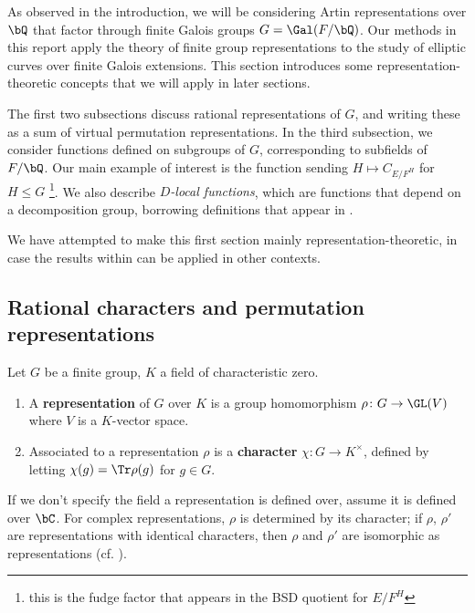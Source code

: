As observed in the introduction, we will be considering Artin representations over $\bQ$ that factor through finite Galois groups $G = \Gal(F / \bQ)$. Our methods in this report apply the theory of finite group representations to the study of elliptic curves over finite Galois extensions. This section introduces some representation-theoretic concepts that we will apply in later sections. 

The first two subsections discuss rational representations of $G$, and writing these as a sum of virtual permutation representations.
In the third subsection, we consider functions defined on subgroups of $G$, corresponding to subfields of $F / \bQ$. Our main example of interest is the function sending $H \mapsto C_{E / F^H}$ for $H \leq G$ \footnote{this is the fudge factor that appears in the BSD quotient for $E / F^H$}. We also describe \textit{$D$-local functions}, which are functions that depend on a decomposition group, borrowing definitions that appear in \cite[Section 2.iii]{reg-const}.

We have attempted to make this first section mainly representation-theoretic, in case the results within can be applied in other contexts.

\subsection{Rational characters and permutation representations}\label{rep}

\begin{defn} 
    Let $G$ be a finite group, $K$ a field of characteristic zero.
\begin{enumerate}
    \setlength\itemsep{0em}
    \item A \textbf{representation} of $G$ over $K$ is a group homomorphism $\rho \colon G \to \GL(V)$ where $V$ is a $K$-vector space.
    \item  Associated to a representation $\rho$ is a \textbf{character} $\chi \colon G \to K^{\times}$, defined by letting $\chi(g) = \Tr \rho(g)$ for $g \in G$. 
\end{enumerate}
\end{defn}

If we don't specify the field a representation is defined over, assume it is defined over $\bC$. For complex representations, $\rho$ is determined by its character; if $\rho$, $\rho'$ are representations with identical characters, then $\rho$ and $\rho'$ are isomorphic as representations (cf. \cite[Chapter 2, \S 2.3]{Serre}). 

